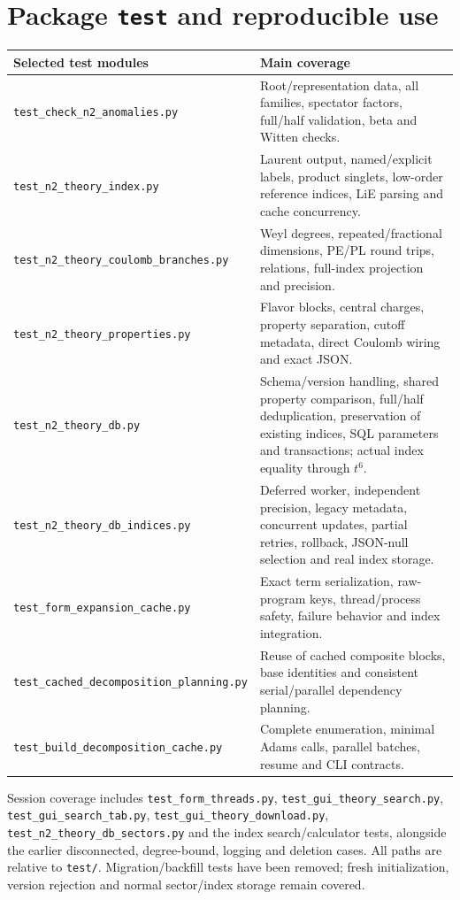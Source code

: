 \documentclass[11pt,a4paper]{article}
\numberwithin{equation}{section}
\newcommand{\code}[1]{{\small\nolinkurl{#1}}}
\begin{document}
\section{Package \texttt{test} and reproducible use}\label{sec:test}
\begingroup\small
{\small
\begin{tabularx}{\textwidth}{@{}p{72mm}Y@{}}
\toprule Selected test modules & Main coverage\\\midrule
\code{test_check_n2_anomalies.py} & Root/representation data, all families,
spectator factors, full/half validation, beta and Witten checks.\\
\code{test_n2_theory_index.py} & Laurent output, named/explicit labels, product
singlets, low-order reference indices, LiE parsing and cache concurrency.\\
\code{test_n2_theory_coulomb_branches.py} & Weyl degrees, repeated/fractional
dimensions, PE/PL round trips, relations, full-index projection and precision.\\
\code{test_n2_theory_properties.py} & Flavor blocks, central charges, property
separation, cutoff metadata, direct Coulomb wiring and exact JSON.\\
\code{test_n2_theory_db.py} & Schema/version handling, shared property comparison,
full/half deduplication, preservation of existing indices, SQL parameters and
transactions; actual index equality through $t^6$.\\
\code{test_n2_theory_db_indices.py} & Deferred worker,
independent precision, legacy metadata, concurrent updates, partial retries,
rollback, JSON-null selection and real index storage.\\
\code{test_form_expansion_cache.py} & Exact term serialization, raw-program keys,
thread/process safety, failure behavior and index integration.\\
\code{test_cached_decomposition_planning.py} & Reuse of cached composite blocks,
base identities and consistent serial/parallel dependency planning.\\
\code{test_build_decomposition_cache.py} & Complete enumeration, minimal Adams
calls, parallel batches, resume and CLI contracts.\\\bottomrule
\end{tabularx}}

Session coverage includes \code{test_form_threads.py},
\code{test_gui_theory_search.py}, \code{test_gui_search_tab.py},
\code{test_gui_theory_download.py}, \code{test_n2_theory_db_sectors.py}
and the index search/calculator tests, alongside the earlier disconnected,
degree-bound, logging and deletion cases. All paths are relative to
\code{test/}. Migration/backfill tests have been removed; fresh initialization,
version rejection and normal sector/index storage remain covered.
\end{document}
